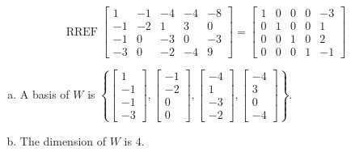 \begin{exerciseAnswer} 


\[\operatorname{RREF} \left[\begin{array}{ccccc}
1 & -1 & -4 & -4 & -8 \\
-1 & -2 & 1 & 3 & 0 \\
-1 & 0 & -3 & 0 & -3 \\
-3 & 0 & -2 & -4 & 9
\end{array}\right] = \left[\begin{array}{ccccc}
1 & 0 & 0 & 0 & -3 \\
0 & 1 & 0 & 0 & 1 \\
0 & 0 & 1 & 0 & 2 \\
0 & 0 & 0 & 1 & -1
\end{array}\right] \]


\begin{enumerate}[(a)]
\item A basis of \(W\) is \( \left\{ \left[\begin{array}{c}
1 \\
-1 \\
-1 \\
-3
\end{array}\right] , \left[\begin{array}{c}
-1 \\
-2 \\
0 \\
0
\end{array}\right] , \left[\begin{array}{c}
-4 \\
1 \\
-3 \\
-2
\end{array}\right] , \left[\begin{array}{c}
-4 \\
3 \\
0 \\
-4
\end{array}\right] \right\} \).
\item The dimension of \(W\) is \( 4 \).
\end{enumerate}
    
\end{exerciseAnswer}
    
